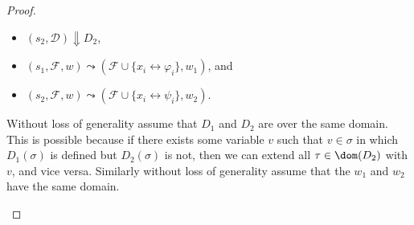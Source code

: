 \begin{proof}
\begin{itemize}[leftmargin=*]
\begin{itemize}
      \item $(s_2, \mathcal D) \Downarrow D_2$,
      \item $(s_1, \mathcal F, w) \leadsto (\mathcal F \cup \{x_i \leftrightarrow \varphi_i\}, w_1)$, and
      \item $(s_2, \mathcal F, w) \leadsto (\mathcal F \cup \{x_i \leftrightarrow \psi_i\}, w_2)$.
    \end{itemize}
    Without loss of generality assume that $D_1$ and $D_2$ are over the same domain.
    This is possible because if there exists some variable $v$ such that $v \in \sigma$ in which $D_1(\sigma)$ is defined but $D_2(\sigma)$ is not,
    then we can extend all $\tau \in \dom(D_2)$ with $v$, and vice versa. Similarly without loss of generality assume that the $w_1$ and $w_2$ have the same domain.


\end{itemize}
\end{proof}
